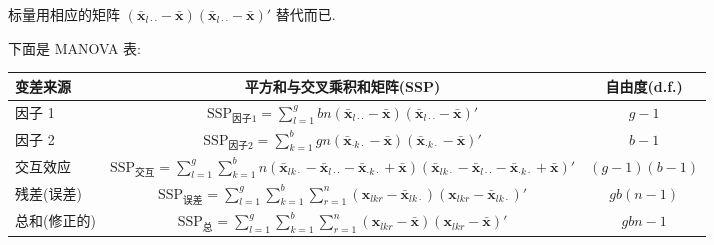 标量用相应的矩阵 $(\bar{\mathbf{x}}_{l\cdot\cdot}-\bar{\mathbf{x}})(\bar{\mathbf{x}}_{l\cdot\cdot}-\bar{\mathbf{x}})'$ 替代而已.

下面是 MANOVA 表:

\begin{mvtable}
{\small
\begin{tabular}{lcc}
\toprule
变差来源 & 平方和与交叉乘积和矩阵(SSP) & 自由度(d.f.)\\
\midrule
因子 1 & $\mathrm{SSP}_{\text{因子1}}=\sum_{l=1}^{g}bn(\bar{\mathbf{x}}_{l\cdot\cdot}-\bar{\mathbf{x}})(\bar{\mathbf{x}}_{l\cdot\cdot}-\bar{\mathbf{x}})'$ & $g-1$\\
因子 2 & $\mathrm{SSP}_{\text{因子2}}=\sum_{k=1}^{b}gn(\bar{\mathbf{x}}_{\cdot k\cdot}-\bar{\mathbf{x}})(\bar{\mathbf{x}}_{\cdot k\cdot}-\bar{\mathbf{x}})'$ & $b-1$\\
交互效应 & $\mathrm{SSP}_{\text{交互}}=\sum_{l=1}^{g}\sum_{k=1}^{b}n(\bar{\mathbf{x}}_{lk\cdot}-\bar{\mathbf{x}}_{l\cdot\cdot}-\bar{\mathbf{x}}_{\cdot k\cdot}+\bar{\mathbf{x}})(\bar{\mathbf{x}}_{lk\cdot}-\bar{\mathbf{x}}_{l\cdot\cdot}-\bar{\mathbf{x}}_{\cdot k\cdot}+\bar{\mathbf{x}})'$ & $(g-1)(b-1)$\\
残差(误差) & $\mathrm{SSP}_{\text{误差}}=\sum_{l=1}^{g}\sum_{k=1}^{b}\sum_{r=1}^{n}(\mathbf{x}_{lkr}-\bar{\mathbf{x}}_{lk\cdot})(\mathbf{x}_{lkr}-\bar{\mathbf{x}}_{lk\cdot})'$ & $gb(n-1)$\\
总和(修正的) & $\mathrm{SSP}_{\text{总}}=\sum_{l=1}^{g}\sum_{k=1}^{b}\sum_{r=1}^{n}(\mathbf{x}_{lkr}-\bar{\mathbf{x}})(\mathbf{x}_{lkr}-\bar{\mathbf{x}})'$ & $gbn-1$\\
\bottomrule
\end{tabular}
}
\end{mvtable}

